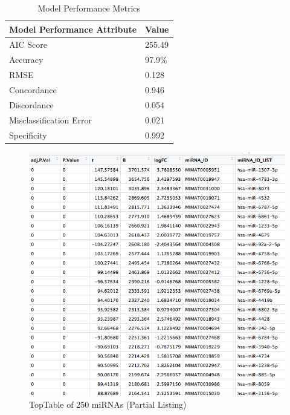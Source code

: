 \documentclass{bioinfo}
\begin{document}
\begin{table}[htb]
\centering
\caption{Model Performance Metrics}
\label{tab:modelperf}
\begin{tabular}{ll}
\hline
\textbf{Model Performance Attribute} & \textbf{Value} \\ \hline
AIC Score                            & 255.49         \\
Accuracy                             & 97.9\%         \\
RMSE                                 & 0.128          \\
Concordance                          & 0.946          \\
Discordance                          & 0.054          \\
Misclassification Error              & 0.021          \\
Specificity                          & 0.992          \\ \hline
\end{tabular}
\end{table}



\begin{figure}[htbp]
\centering
\includegraphics[scale=0.40]{TopTable.png}
\caption{TopTable of 250 miRNAs (Partial Listing)}
\label{fig:TopTable}
\end{figure}
\end{document}
